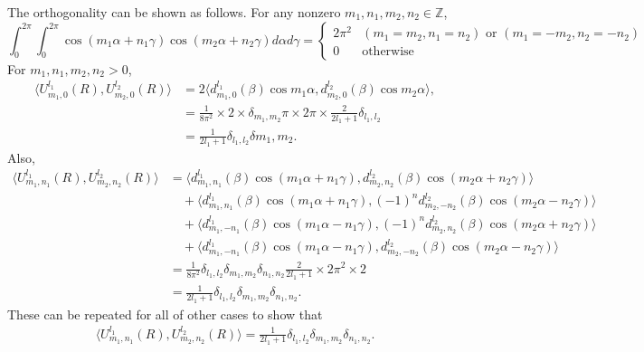 \documentclass[onecolumn,11pt]{IEEEtran}
\newcommand{\pair}[1]{\ensuremath{\langle #1 \rangle}}
\begin{document}
The orthogonality can be shown as follows. 
For any nonzero $m_1,n_1,m_2,n_2\in\mathbb{Z}$,
\[
    \int_{0}^{2\pi}\int_0^{2\pi} \cos(m_1\alpha+n_1\gamma)\cos(m_2\alpha+n_2\gamma) d\alpha d\gamma = 
    \begin{cases}
        2\pi^2 & (m_1=m_2,n_1=n_2) \text{ or } (m_1=-m_2,n_2=-n_2)\\
        0 & \text{otherwise}
    \end{cases}
\]
For $m_1,n_1,m_2,n_2 > 0$, 
\begin{align*}
    \pair{ U^{l_1}_{m_1,0}(R), U^{l_2}_{m_2,0}(R) } & = 2 \pair{ d^{l_1}_{m_1,0}(\beta) \cos m_1\alpha , d^{l_2}_{m_2,0}(\beta)\cos m_2\alpha },\\
                                                    & = \frac{1}{8\pi^2}\times  2 \times \delta_{m_1,m_2} \pi \times 2\pi \times \frac{2}{2l_1+1} \delta_{l_1,l_2}\\
                                                    & = \frac{1}{2l_1+1} \delta_{l_1,l_2}\delta{m_1,m_2}.
\end{align*}
Also,
\begin{align*}
    \pair{ U^{l_1}_{m_1,n_1}(R), U^{l_2}_{m_2,n_2}(R) } & =
                                                  \pair{ d^{l_1}_{m_1,n_1}(\beta)\cos(m_1\alpha+n_1\gamma), d^{l_2}_{m_2,n_2}(\beta)\cos(m_2\alpha+n_2\gamma) }\\
                                                  &\quad +\pair{ d^{l_1}_{m_1,n_1}(\beta)\cos(m_1\alpha+n_1\gamma), (-1)^n d^{l_2}_{m_2,-n_2}(\beta)\cos(m_2\alpha-n_2\gamma) }\\
                                                  &\quad +\pair{ d^{l_1}_{m_1,-n_1}(\beta)\cos(m_1\alpha-n_1\gamma), (-1)^nd^{l_2}_{m_2,n_2}(\beta)\cos(m_2\alpha+n_2\gamma) }\\
                                                  &\quad +\pair{ d^{l_1}_{m_1,-n_1}(\beta)\cos(m_1\alpha-n_1\gamma), d^{l_2}_{m_2,-n_2}(\beta)\cos(m_2\alpha-n_2\gamma) }\\
                                                  & = \frac{1}{8\pi^2} \delta_{l_1,l_2}\delta_{m_1,m_2} \delta_{n_1,n_2} \frac{2}{2l_1+1}\times 2\pi^2 \times 2\\
                                                  & = \frac{1}{2l_1+1} \delta_{l_1,l_2}\delta_{m_1,m_2} \delta_{n_1,n_2}.
\end{align*}
These can be repeated for all of other cases to show that
\begin{align}
    \pair{ U^{l_1}_{m_1,n_1}(R) , U^{l_2}_{m_2,n_2} (R) } =  \frac{1}{2l_1+1} \delta_{l_1,l_2}\delta_{m_1,m_2} \delta_{n_1,n_2}.\label{eqn:U_ortho}
\end{align}
\end{document}
